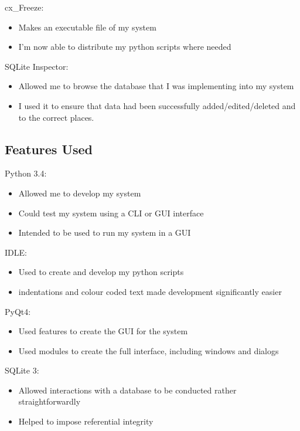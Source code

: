 cx\_Freeze:
\begin{itemize}
    \item Makes an executable file of my system
    \item I'm now able to distribute my python scripts where needed
\end{itemize}


SQLite Inspector:
\begin{itemize}
    \item Allowed me to browse the database that I was implementing into my system
    \item I used it to ensure that data had been successfully added/edited/deleted and to the correct places.
\end{itemize}


\subsection{Features Used}

Python 3.4:
\begin{itemize}
    \item Allowed me to develop my system
    \item Could test my system using a CLI or GUI interface
    \item Intended to be used to run my system in a GUI
\end{itemize}

IDLE:
\begin{itemize}    
    \item Used to create and develop my python scripts
    \item indentations and colour coded text made development significantly easier
\end{itemize}

PyQt4:
\begin{itemize}
    \item Used features to create the GUI for the system
    \item Used modules to create the full interface, including windows and dialogs
\end{itemize}

SQLite 3:
\begin{itemize}
    \item Allowed interactions with a database to be conducted rather straightforwardly
    \item Helped to impose referential integrity
\end{itemize}

